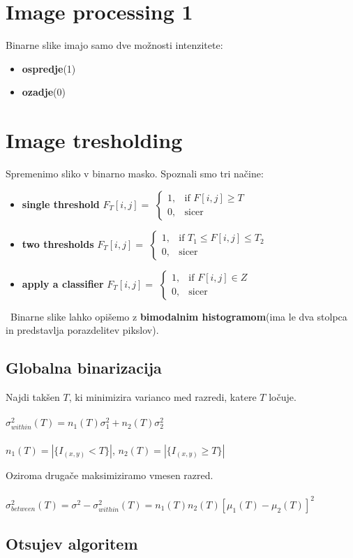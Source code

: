 \documentclass[11pt]{article}
\begin{document}
\newpage

\section{Image processing 1}
Binarne slike imajo samo dve mo\v{z}nosti intenzitete:
\begin{itemize}
\item \textbf{ospredje}(1)
\item \textbf{ozadje}(0)
\end{itemize}

\section{Image tresholding}
Spremenimo sliko v binarno masko. Spoznali smo tri na\v{c}ine:
\begin{itemize}
\item \textbf{single threshold} $F_T[i, j] = $
$
\begin{cases}
	1, & \text{if } F[i, j] \geq T \\
	0, & \text{sicer}
\end{cases}
$
\item \textbf{two thresholds} $F_T[i, j] = $
$
\begin{cases}
	1, & \text{if } T_1 \leq F[i, j] \leq T_2 \\
	0, & \text{sicer}
\end{cases}
$
\item \textbf{apply a classifier} $F_T[i, j] = $
$
\begin{cases}
	1, & \text{if } F[i, j] \in Z \\
	0, & \text{sicer}
\end{cases}
$
\end{itemize}
\
Binarne slike lahko opi\v{s}emo z \textbf{bimodalnim histogramom}(ima le dva stolpca in predstavlja porazdelitev pikslov).

\subsection{Globalna binarizacija}
Najdi tak\v{s}en $T$, ki minimizira varianco med razredi, katere $T$ lo\v{c}uje. \\
\\
$\sigma^2_{within}(T) = n_1(T)\sigma^2_1 + n_2(T)\sigma^2_2$ \\
\\
$n_1(T) = |\{I_{(x, y)} < T\}|$, $n_2(T) = |\{I_{(x, y)} \geq T\}|$

Oziroma druga\v{c}e maksimiziramo vmesen razred. \\
\\
$\sigma^2_{between}(T) = \sigma^2 - \sigma^2_{within}(T) = n_1(T)n_2(T)[\mu_1(T) - \mu_2(T)]^2$

\newpage

\subsection{Otsujev algoritem}
\end{document}
